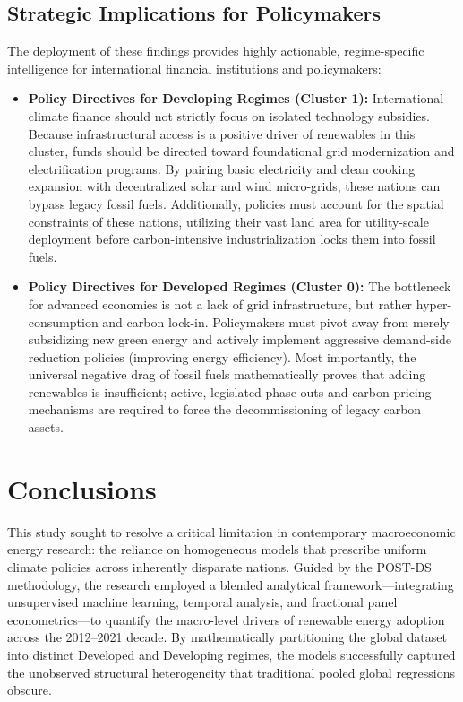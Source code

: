 \documentclass[a4paper,11pt]{article}
\begin{document}
\subsection{Strategic Implications for Policymakers}
The deployment of these findings provides highly actionable, regime-specific intelligence for international financial institutions and policymakers:
\begin{itemize}
    \item \textbf{Policy Directives for Developing Regimes (Cluster 1):} International climate finance should not strictly focus on isolated technology subsidies. Because infrastructural access is a positive driver of renewables in this cluster, funds should be directed toward foundational grid modernization and electrification programs. By pairing basic electricity and clean cooking expansion with decentralized solar and wind micro-grids, these nations can bypass legacy fossil fuels. Additionally, policies must account for the spatial constraints of these nations, utilizing their vast land area for utility-scale deployment before carbon-intensive industrialization locks them into fossil fuels.
    \item \textbf{Policy Directives for Developed Regimes (Cluster 0):} The bottleneck for advanced economies is not a lack of grid infrastructure, but rather hyper-consumption and carbon lock-in. Policymakers must pivot away from merely subsidizing new green energy and actively implement aggressive demand-side reduction policies (improving energy efficiency). Most importantly, the universal negative drag of fossil fuels mathematically proves that adding renewables is insufficient; active, legislated phase-outs and carbon pricing mechanisms are required to force the decommissioning of legacy carbon assets.
\end{itemize}

\section{Conclusions}

This study sought to resolve a critical limitation in contemporary macroeconomic energy research: the reliance on homogeneous models that prescribe uniform climate policies across inherently disparate nations.
Guided by the POST-DS methodology, the research employed a blended analytical framework—integrating unsupervised machine learning, temporal analysis, and fractional panel econometrics—to quantify the macro-level drivers of renewable energy adoption across the 2012--2021 decade.
By mathematically partitioning the global dataset into distinct Developed and Developing regimes, the models successfully captured the unobserved structural heterogeneity that traditional pooled global regressions obscure.
\end{document}
